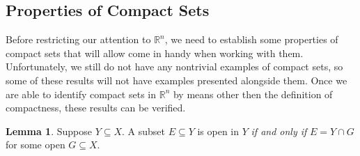 \documentclass{article}
\newcommand{\R}{\mathbb{R}}
\theoremstyle{definition}
\newtheorem{lemma}{Lemma}[section]
\begin{document}
\subsection{Properties of Compact Sets}
Before restricting our attention to $ \R^n $, we need to establish some properties of compact sets that will allow come in handy when working with them. Unfortunately, we still do not have any nontrivial examples of compact sets, so some of these results will not have examples presented alongside them. Once we are able to identify compact sets in $ \R^n $ by means other then the definition of compactness, these results can be verified. 
\begin{lemma}
	Suppose $ Y\subseteq X $. A subset $ E\subseteq Y$ is open in $ Y $ \textit{if and only if} $ E=Y\cap G $ for some open $ G\subseteq X $. 
\end{lemma}
\end{document}
